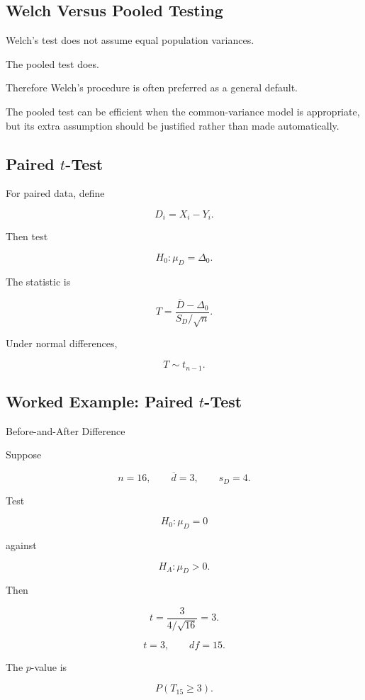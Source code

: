 \subsection{Welch Versus Pooled Testing}
\label{subsec:welch-versus-pooled-test}

Welch's test does not assume equal population variances.

The pooled test does.

Therefore Welch's procedure is often preferred as a general default.

The pooled test can be efficient when the common-variance model is
appropriate, but its extra assumption should be justified rather than
made automatically.

\subsection{Paired \(t\)-Test}
\label{subsec:paired-t-test}

For paired data, define

\[
D_i
=
X_i-Y_i.
\]

Then test

\[
\boxed{
H_0:\mu_D=\Delta_0.
}
\]

The statistic is

\[
\boxed{
T
=
\frac{
\overline{D}-\Delta_0
}{
S_D/\sqrt{n}
}.
}
\]

Under normal differences,

\[
\boxed{
T\sim t_{n-1}.
}
\]

\subsection{Worked Example: Paired \(t\)-Test}
\label{subsec:worked-paired-t-test}

\begin{workedexamplebox}{Before-and-After Difference}

Suppose

\[
n=16,
\qquad
\overline{d}=3,
\qquad
s_D=4.
\]

Test

\[
H_0:\mu_D=0
\]

against

\[
H_A:\mu_D>0.
\]

Then

\[
t
=
\frac{
3
}{
4/\sqrt{16}
}
=
3.
\]

\begin{answerbox}
\[
\boxed{
t=3,
\qquad
df=15.
}
\]
\end{answerbox}

The \(p\)-value is

\[
P(T_{15}\geq3).
\]

\end{workedexamplebox}

